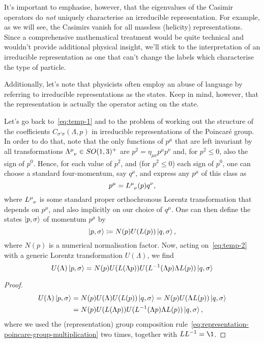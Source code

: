It's important to emphasise, however, that the eigenvalues of the Casimir operators do \emph{not} uniquely characterise an irreducible representation. For example, as we will see, the Casimirs vanish for all massless (helicity) representations. Since a comprehensive mathematical treatment would be quite technical and wouldn't provide additional physical insight, we'll stick to the interpretation of an irreducible representation as one that can't change the labels which characterise the type of particle. 

Additionally, let's note that physicists often employ an abuse of language by referring to irreducible representations as the states. Keep in mind, however, that the representation is actually the operator acting on the state.

Let's go back to~\eqref{eq:temp-1} and to the problem of working out the structure of the coefficients $C_{\sigma'\sigma}(\Lambda,p)$ in irreducible representations of the Poincaré group. In order to do that, note that the only functions of $p^\mu$ that are left invariant by all transformations $\tensor{\Lambda}{^\mu_\nu} \in SO(1,3)^+$ are $p^2 = \eta_{\mu\nu} p^\mu p^\nu$ and, for $p^2 \leq 0$, also the sign of $p^0$. Hence, for each value of $p^2$, and (for $p^2 \leq 0$) each sign of $p^0$, one can choose a standard four-momentum, say $q^\mu$, and express any $p^\mu$ of this class as
\begin{equation}
    p^\mu = \tensor{L}{^\mu_\nu}(p)q^\nu,
\end{equation}
where $\tensor{L}{^\mu_\nu}$ is some standard proper orthochronous Lorentz transformation that depends on $p^\mu$, and also implicitly on our choice of $q^\mu$. One can then define the states $\ket{p,\sigma}$ of momentum $p^\mu$ by
\begin{equation}\label{eq:temp-2}
    \ket{p,\sigma} \coloneq N(p) U(L(p)) \ket{q,\sigma},
\end{equation}
where $N(p)$ is a numerical normalisation factor. Now, acting on~\eqref{eq:temp-2} with a generic Lorentz transformation $U(\Lambda)$, we find
\begin{equation}\label{eq:temp-3}
    U(\Lambda) \ket{p,\sigma} = N(p) U(L(\Lambda p)) U(L^{-1}(\Lambda p) \Lambda L(p)) \ket{q,\sigma}
\end{equation}
\begin{proof}
    \begin{equation*}
    \begin{split}
        U(\Lambda) \ket{p,\sigma} &= N(p) U(\Lambda) U(L(p)) \ket{q,\sigma} = N(p) U(\Lambda L(p)) \ket{q,\sigma}\\
         &= N(p) U(L(\Lambda p)) U(L^{-1}(\Lambda p) \Lambda L(p)) \ket{q,\sigma} ,
    \end{split}
    \end{equation*}
    where we used the (representation) group composition rule~\eqref{eq:representation-poincare-group-multiplication} two times, together with $L L^{-1} = \1$.
\end{proof}

